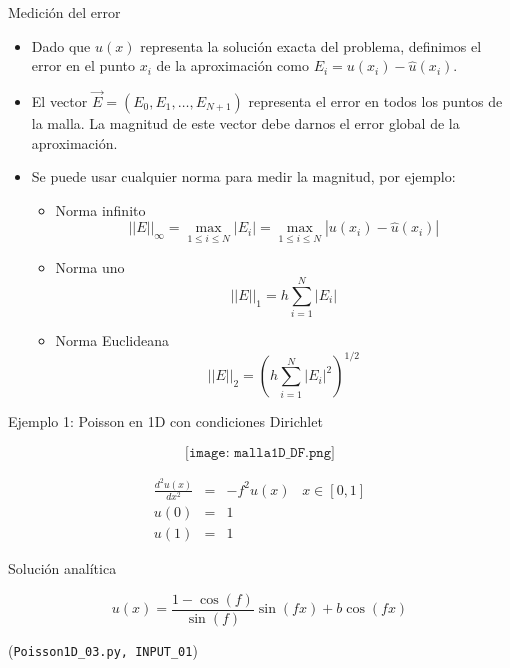 \documentclass[handout]{beamer}
\newcommand{\Vector}[1]{\vec{#1}}
\begin{document}
\begin{frame}{Medici\'on del error}

\begin{itemize}[<+->]
\item Dado que $\hat{u}(x)$ representa la soluci\'on exacta del problema, definimos el error en el punto $x_i$ de la aproximaci\'on como $E_i = u(x_i) - \hat{u}(x_i)$. 

\item El vector $\Vector{E} = (E_0, E_1, \dots, E_{N+1})$ representa el error en todos los puntos de la malla. La magnitud de este vector debe darnos el error global de la aproximaci\'on. 

\item Se puede usar cualquier norma para medir la magnitud, por ejemplo:

\begin{small}
\begin{itemize}
\item Norma infinito
\[
|| E ||_\infty = \max\limits_{1 \leq i \leq N}|E_i| = \max\limits_{1 \leq i \leq N} |u(x_i) - \hat{u}(x_i) |
\]

\item Norma uno
\[
||E||_1 = h \sum\limits_{i=1}^{N} |E_i|
\]

\item Norma Euclideana
\[
||E||_2 = \left(h \sum\limits_{i=1}^{N} |E_i|^2 \right)^{1/2}
\]
\end{itemize}

\end{small}

\end{itemize}

\end{frame}

\begin{frame}{Ejemplo 1: Poisson en 1D con condiciones Dirichlet}

{\small 
$$\texttt{[image: malla1D\_DF.png]}$$

\begin{eqnarray*}
\frac{d^2 u(x)}{d x^2} & = & -f^2 u(x) \,\,\,\,\, x \in [0,1] \\
u(0) & = & 1 \\
u(1) & = & 1
\end{eqnarray*}

Soluci\'on anal\'itica

\[
u(x) = \frac{1-\cos(f)}{\sin(f)} \sin(f x) + b\cos(f x)
\]

(\texttt{Poisson1D\_03.py, INPUT\_01})
}
\end{frame}
\end{document}
